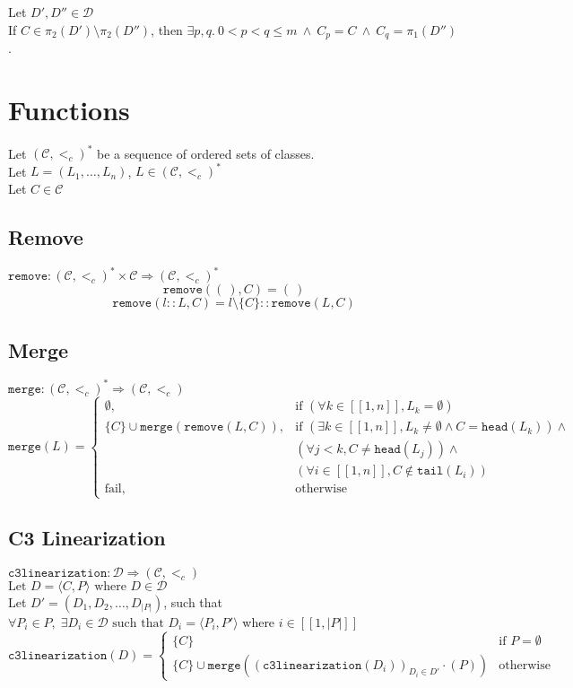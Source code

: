 \documentclass{article}
\newcommand*{\CC}{\ensuremath{\mathcal{C}}\xspace}
\newcommand*{\DD}{\ensuremath{\mathcal{D}}\xspace}
\newcommand*{\ordCC}{\ensuremath{(\mathcal{C}, <_c)}\xspace}
\newcommand*{\cl}{\texttt{c3linearization}}
\newcommand*{\rem}{\texttt{remove}}
\newcommand*{\h}{\texttt{head}}
\newcommand*{\mer}{\texttt{merge}}
\newcommand*{\oneToN}{\ensuremath{[\![1,n]\!]}\xspace}
\begin{document}
Let $D', D'' \in \DD$ \\
If $C \in \pi_2(D') \setminus \pi_2(D'')$, then $\exists p,q. \ 0 < p < q \leq m \ \wedge \ C_p = C \ \wedge \ C_q = \pi_1(D'')$.
\vspace{2cm}

\section*{Functions}

Let $\ordCC^*$ be a sequence of ordered sets of classes.\\
Let $L = (L_1, \ldots , L_n)$, $L \in \ordCC^*$\\
Let $C \in \mathcal{C}$\\

\subsection*{Remove}

$\rem : \ordCC^* \times \CC \Rightarrow \ordCC^*$\\
\[
\rem(( \ ), C) = ( \ )
\]
\[
\rem(l::L, C) = l \setminus \{C\} :: \rem(L,C)
\]

\subsection*{Merge}
$\mer : \ordCC^* \Rightarrow \ordCC $ \\


\[
\mer(L) =
\begin{cases}
\emptyset, & \text{if } (\forall k \in \oneToN, L_k = \emptyset)\\
\{C\} \cup \mer(\rem(L, C)), & \text{if } (\exists k \in \oneToN, L_k \neq \emptyset \land C = \h(L_k)) \land \\
& (\forall j < k, C \neq \h(L_j)) \land \\ 
& (\forall i \in \oneToN,C \notin \texttt{tail}(L_i)) \\ 

\text{fail},  & \text{otherwise}
\end{cases}
\]

\subsection*{C3 Linearization}
$\cl: \DD \Rightarrow \ordCC$\\
$\text{Let } D = \langle C, P \rangle \text{ where } D \in \DD$\\
Let $D' = (D_1,D_2, \dots ,D_{|P|})$, such that \\ %
$\forall P_i \in P, \; \exists D_i \in \DD \text{ such that } D_i = \langle P_i, P' \rangle$ where $i \in  [\![1, |P|]\!]$\\

\[
\cl(D) =
\begin{cases}
\{C\} & \text{if } P = \emptyset \\
\{C\} \cup \mer\left( (\cl(D_i))_{D_i \in D'} \cdot (P) \right) & \text{otherwise}
\end{cases}
\]
\end{document}
